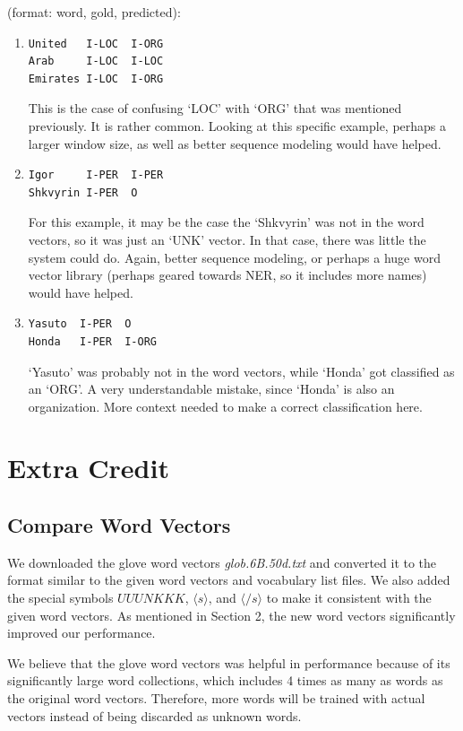 \documentclass[12pt, twocolumn]{article}
\begin{document}
(format: word, gold, predicted):
\begin{enumerate}
\item
\begin{verbatim}
United   I-LOC  I-ORG
Arab     I-LOC  I-LOC
Emirates I-LOC  I-ORG
\end{verbatim}
This is the case of confusing `LOC' with `ORG' that was mentioned previously. It is rather common. Looking at this specific example, perhaps a larger window size, as well as better sequence modeling would have helped.
\item
\begin{verbatim}
Igor     I-PER  I-PER
Shkvyrin I-PER  O
\end{verbatim}
For this example, it may be the case the `Shkvyrin' was not in the word vectors, so it was just an `UNK' vector. In that case, there was little the system could do. Again, better sequence modeling, or perhaps a huge word vector library (perhaps geared towards NER, so it includes more names) would have helped.
\item
\begin{verbatim}
Yasuto  I-PER  O
Honda   I-PER  I-ORG
\end{verbatim}
`Yasuto' was probably not in the word vectors, while `Honda' got classified as an `ORG'. A very understandable mistake, since `Honda' is also an organization. More context needed to make a correct classification here.
\end{enumerate}
\section{Extra Credit}
\subsection{Compare Word Vectors}
We downloaded the glove word vectors \textit{glob.6B.50d.txt} and converted it to the format similar to the given word vectors and vocabulary list files. We also added the special symbols $UUUNKKK$, $\langle s\rangle$, and $\langle /s\rangle$ to make it consistent with the given word vectors. As mentioned in Section 2, the new word vectors significantly improved our performance.

We believe that the glove word vectors was helpful in performance because of its significantly large word collections, which includes 4 times as many as words as the original word vectors. Therefore, more words will be trained with actual vectors instead of being discarded as unknown words.
\end{document}
